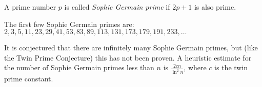 \documentclass[12pt]{article}
\begin{document}

A prime number $p$ is called \emph{Sophie Germain prime} if $2p+1$ is also prime.

The first few Sophie Germain primes are:
$2, 3, 5, 11, 23, 29, 41, 53, 83, 89, 113, 131, 173, 179, 191, 233,\dots$

It is conjectured that there are infinitely many Sophie Germain primes,
but (like the Twin Prime Conjecture) this has not been proven.
A heuristic estimate for the number of Sophie Germain primes less than $n$ is $\frac{2cn}{\ln^2{n}}$, where $c$ is the twin prime constant.

\end{document}
